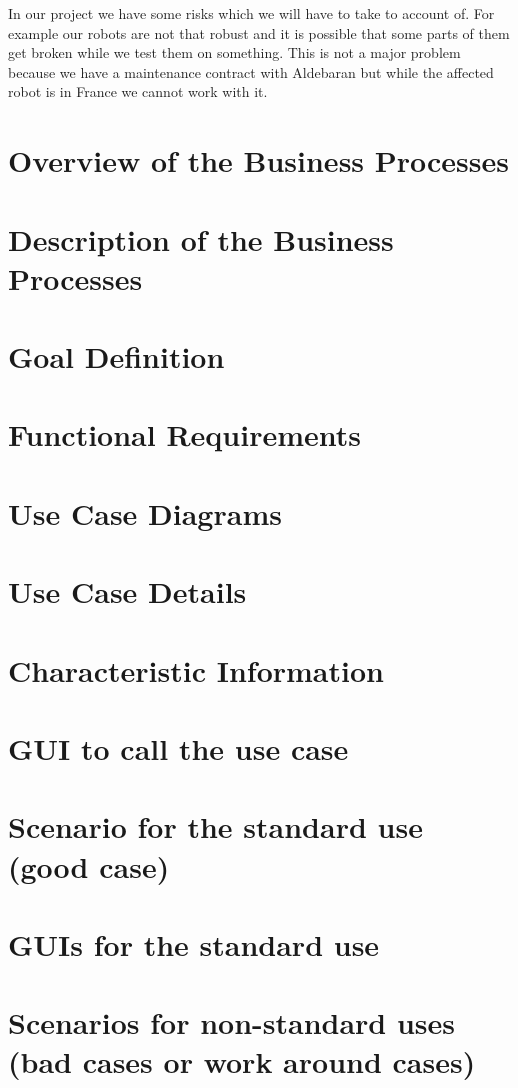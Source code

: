 \documentclass[12pt]{article}
\theoremstyle{definition}
\begin{document}
In our project we have some risks which we will have to take to account of. For example our robots are not that robust and it is possible that some parts of them get broken while we test them on something. This is not a major problem because we have a maintenance contract with Aldebaran but while the affected robot is in France we cannot work with it.  

\section{Overview of the Business Processes}

\section{Description of the Business Processes}

\section{Goal Definition}
\pagebreak
\section{Functional Requirements}
\section{Use Case Diagrams}
\section{ Use Case Details}
\section{Characteristic Information}
\section{GUI to call the use case}
\section{Scenario for the standard use (good case)}
\section{GUIs for the standard use}
\section{Scenarios for non-standard uses (bad cases or work around cases)}
\end{document}
